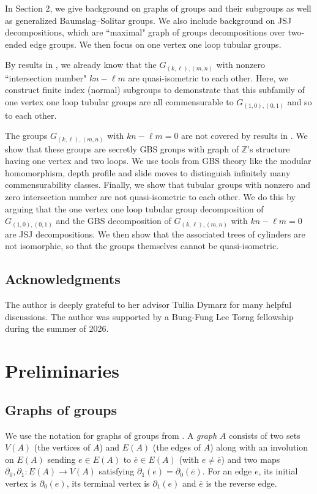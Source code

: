 \documentclass[10pt]{article}
\def\integers{{\mathbb{Z}}}
\theoremstyle{definition}
\begin{document}
In Section 2, we give background on  graphs of groups and their subgroups as well as generalized Baumslag--Solitar groups. We also include background on JSJ decompositions, which are ``maximal" graph of groups decompositions over two-ended edge groups. We then focus on one vertex one loop tubular groups. 


By results in \cite{Cashen}, we already know that
the $G_{(k,\ell),(m,n)}$ with nonzero ``intersection number" $kn - \ell m$ are quasi-isometric to each other. Here, we construct finite index (normal) subgroups to demonstrate that this subfamily of one vertex one loop tubular groups  are all commensurable to $G_{(1,0),(0,1)}$ and so to each other. 

The groups $G_{(k,\ell),(m,n)}$ with $kn -\ell m = 0$ are not covered by results in \cite{Cashen}.  We show that these groups are secretly GBS groups with graph of $\integers$'s structure having one vertex and two loops. We  use tools from GBS theory like the modular homomorphism, depth profile and slide moves to distinguish infinitely many commensurability classes. Finally, we show that tubular groups with nonzero and zero intersection number are not quasi-isometric to each other. We do this by arguing that the one vertex one loop tubular group decomposition of $G_{(1,0),(0,1)}$ and the GBS decomposition of $G_{(k,\ell),(m,n)}$ with $kn -\ell m = 0$ are  JSJ decompositions. We then show that the associated trees of cylinders are not isomorphic, so that the groups themselves cannot be quasi-isometric. 


\subsection*{Acknowledgments}
The author is deeply grateful to her advisor Tullia Dymarz for many helpful discussions. The author was supported by a Bung-Fung Lee Torng fellowship during the summer of 2026. 


\section{Preliminaries}
\subsection{Graphs of groups}

We use the notation for graphs of groups from \cite{ScottWall}. A \textit{graph} $A$ consists of two sets $V(A)$ (the vertices of $A$) and $E(A)$ (the edges of $A$) along with an involution on $E(A)$ sending $e\in E(A)$ to $\overline{e} \in E(A)$ (with $e\ne \overline{e}$) and two maps $\partial_0, \partial_1:E(A) \to V(A)$ satisfying $\partial_1(e) = \partial_0(\overline{e})$. For an edge $e$, its initial vertex is $\partial_0(e)$, its terminal vertex is $\partial_1(e)$ and $\overline{e}$ is the reverse edge. 
\end{document}

